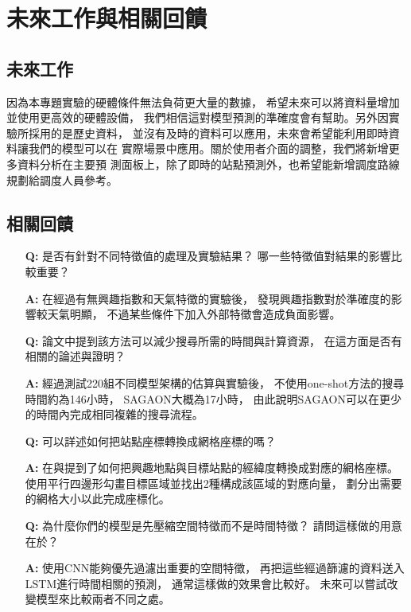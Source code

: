 \documentclass[a4paper,12pt]{extarticle}
\begin{document}
    \newpage
    \section{未來工作與相關回饋}
        \subsection{未來工作}
            因為本專題實驗的硬體條件無法負荷更大量的數據，
            希望未來可以將資料量增加並使用更高效的硬體設備，
            我們相信這對模型預測的準確度會有幫助。另外因實驗所採用的是歷史資料，
            並沒有及時的資料可以應用，未來會希望能利用即時資料讓我們的模型可以在
            實際場景中應用。關於使用者介面的調整，我們將新增更多資料分析在主要預
            測面板上，除了即時的站點預測外，也希望能新增調度路線規劃給調度人員參考。
        \subsection{相關回饋}
            \begin{itemize}
                \item [\textbf{Q:}]
                是否有針對不同特徵值的處理及實驗結果？
                哪一些特徵值對結果的影響比較重要？
                \item [\textbf{A:}]
                在經過有無興趣指數和天氣特徵的實驗後，
                發現興趣指數對於準確度的影響較天氣明顯，
                不過某些條件下加入外部特徵會造成負面影響。
                \item [\textbf{Q:}]
                論文中提到該方法可以減少搜尋所需的時間與計算資源，
                在這方面是否有相關的論述與證明？
                \item [\textbf{A:}]
                經過測試220組不同模型架構的估算與實驗後，
                不使用one-shot方法的搜尋時間約為146小時，
                SAGAON大概為17小時，
                由此說明SAGAON可以在更少的時間內完成相同複雜的搜尋流程。
                \item [\textbf{Q:}]
                可以詳述如何把站點座標轉換成網格座標的嗎？
                \item [\textbf{A:}]
                在與提到了如何把興趣地點與目標站點的經緯度轉換成對應的網格座標。
                使用平行四邊形勾畫目標區域並找出2種構成該區域的對應向量，
                劃分出需要的網格大小以此完成座標化。
                \item [\textbf{Q:}]
                為什麼你們的模型是先壓縮空間特徵而不是時間特徵？
                請問這樣做的用意在於？
                \item [\textbf{A:}]
                使用CNN能夠優先過濾出重要的空間特徵，
                再把這些經過篩濾的資料送入LSTM進行時間相關的預測，
                通常這樣做的效果會比較好。
                未來可以嘗試改變模型來比較兩者不同之處。
            \end{itemize}
\end{document}
